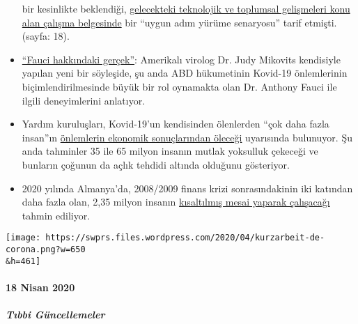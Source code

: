 \begin{itemize}
  bir kesinlikte beklendiği,
  \href{https://swprs.files.wordpress.com/2020/04/rockefeller-foundation-scenarios-2010.pdf}{gelecekteki
  teknolojik ve toplumsal gelişmeleri konu alan çalışma belgesinde} bir
  ``uygun adım yürüme senaryosu'' tarif etmişti. (sayfa: 18).
\item
  \href{https://childrenshealthdefense.org/news/the-truth-about-fauci-featuring-dr-judy-mikovits/}{``Fauci
  hakkındaki gerçek''}: Amerikalı virolog Dr. Judy Mikovits kendisiyle
  yapılan yeni bir söyleşide, şu anda ABD hükumetinin Kovid-19
  önlemlerinin biçimlendirilmesinde büyük bir rol oynamakta olan Dr.
  Anthony Fauci ile ilgili deneyimlerini anlatıyor.
\item
  Yardım kuruluşları, Kovid-19'un kendisinden ölenlerden ``çok daha
  fazla insan''ın
  \href{https://www.welt.de/wirtschaft/article207092745/Corona-Pandemie-Rezession-beschert-der-Welt-die-noch-groessere-Katastrophe.html}{önlemlerin
  ekonomik sonuçlarından öleceği} uyarısında bulunuyor. Şu anda
  tahminler 35 ile 65 milyon insanın mutlak yoksulluk çekeceği ve
  bunların çoğunun da açlık tehdidi altında olduğunu gösteriyor.
\item
  2020 yılında Almanya'da, 2008/2009 finans krizi sonrasındakinin iki
  katından daha fazla olan, 2,35 milyon insanın
  \href{https://www.boeckler.de/pdf/p_wsi_pb_38_2020.pdf}{kısaltılmış
  mesai yaparak çalışacağı} tahmin ediliyor.
\end{itemize}

\texttt{[image: https://swprs.files.wordpress.com/2020/04/kurzarbeit-de-corona.png?w=650\\\&h=461]}

\hypertarget{18-nisan-2020}{%
\paragraph{18 Nisan 2020}\label{18-nisan-2020}}

\hypertarget{tux131bbi-guxfcncellemeler-2}{%
\subparagraph{\texorpdfstring{\textbf{Tıbbi
Güncellemeler}}{Tıbbi Güncellemeler}}\label{tux131bbi-guxfcncellemeler-2}}

